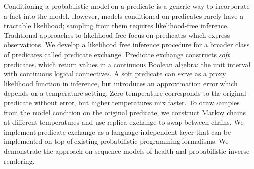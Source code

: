 Conditioning a probabilistic model on a predicate is a generic way to incorporate a fact into the model.
However, models conditioned on predicates rarely have a tractable likelihood; sampling from them requires likelihood-free inference.
Traditional approaches to likelihood-free 
focus on predicates which express observations.
We develop a likelihood free inference procedure for a broader class of
predicates called predicate exchange. 
Predicate exchange constructs \emph{soft} predicates, which return values in a continuous Boolean algebra: the unit interval with continuous logical connectives.
A soft predicate can serve as a proxy likelihood function in inference,
but introduces an approximation error which depends on a temperature setting.
Zero-temperature corresponds to the original predicate without error, but higher temperatures mix faster.
To draw samples from the model condition on the original predicate,
we construct Markov chains at different temperatures and use 
replica exchange to swap between chains.
We implement predicate exchange as a language-independent layer
that can be implemented on top of existing probabilistic programming formalisms. 
We demonstrate the approach on sequence models of health and probabilistic inverse rendering.



% 